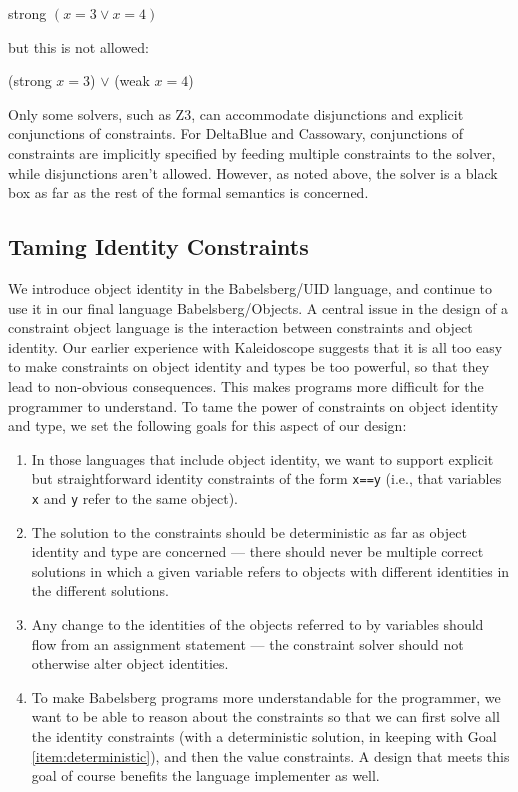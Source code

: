 \documentclass{article}
\begin{document}
strong $(x=3 \vee x=4)$

but this is not allowed:

(strong $x=3$) $\vee$ (weak $x=4$)

Only some solvers, such as Z3, can accommodate disjunctions and
explicit conjunctions of constraints.  For DeltaBlue and Cassowary,
conjunctions of constraints are implicitly specified by feeding
multiple constraints to the solver, while disjunctions aren't allowed.
However, as noted above, the solver is a black box as far as the rest
of the formal semantics is concerned.

\subsection{Taming Identity Constraints}
\label{sec:taming-identity-constraints}
\label{sec:object-structure}

We introduce object identity in the Babelsberg/UID language, and
continue to use it in our final language Babelsberg/Objects.  A
central issue in the design of a constraint object language is the
interaction between constraints and object identity.  Our earlier
experience with Kaleidoscope suggests that it is all too easy to make
constraints on object identity and types be too powerful, so that they
lead to non-obvious consequences.  This makes programs more difficult
for the programmer to understand.  To tame the power of constraints on
object identity and type, we set the following goals for this aspect
of our design:

\begin{enumerate}
\item In those languages that include object identity, we want to
  support explicit but straightforward identity constraints of the
  form \verb|x==y| (i.e., that variables \verb|x| and \verb|y| refer
  to the same object).
\item\label{item:deterministic} The solution to the constraints should
  be deterministic as far as object identity and type are concerned
  --- there should never be multiple correct solutions in which a
  given variable refers to objects with different identities in the
  different solutions.
\item Any change to the identities of the objects referred to by
  variables should flow from an assignment statement --- the constraint
  solver should not otherwise alter object identities.
\item\label{item:solve-identity-then-values} To make Babelsberg
  programs more understandable for the programmer, we want to be able
  to reason about the constraints so that we can first solve all the
  identity constraints (with a deterministic solution, in keeping with
  Goal \ref{item:deterministic}), and then the value constraints.  A
  design that meets this goal of course benefits the language
  implementer as well.
\end{enumerate}
\end{document}
